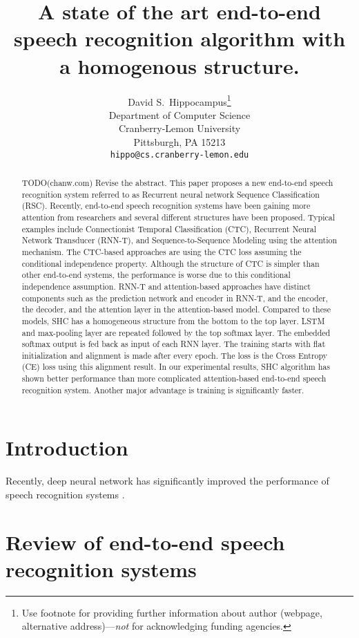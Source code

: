 \documentclass{article}
\title{A state of the art end-to-end speech recognition algorithm with
a homogenous structure.}
\author{
  David S.~Hippocampus\thanks{Use footnote for providing further
    information about author (webpage, alternative
    address)---\emph{not} for acknowledging funding agencies.} \\
  Department of Computer Science\\
  Cranberry-Lemon University\\
  Pittsburgh, PA 15213 \\
  \texttt{hippo@cs.cranberry-lemon.edu} \\
}
\begin{document}

\maketitle

\begin{abstract}
TODO(chanw.com) Revise the abstract.
This paper proposes a new end-to-end speech recognition system referred to
as Recurrent neural network Sequence Classification (RSC). Recently, end-to-end speech
recognition systems have been gaining more attention from researchers and
several different structures have been proposed. Typical examples  
include Connectionist Temporal Classification (CTC), Recurrent Neural Network
  Transducer (RNN-T), and Sequence-to-Sequence Modeling using the attention
mechanism. The CTC-based approaches are using the CTC loss assuming the
conditional independence property. Although the structure of CTC is simpler
than other end-to-end systems, the performance is worse due to this conditional
independence assumption. RNN-T and attention-based approaches have distinct
components such as the prediction network  and encoder in RNN-T, and
the encoder, the decoder, and the attention layer in the attention-based model.
Compared to these models, SHC has a homogeneous structure from the bottom to 
the top layer. LSTM and max-pooling layer are repeated followed by the top
softmax layer. The embedded softmax output is fed back as input of each RNN
layer. The training starts with flat initialization and alignment is made
after every epoch. The loss is the Cross Entropy (CE) loss using this 
alignment result. In our experimental results, SHC algorithm has shown 
better performance than more complicated attention-based end-to-end speech
recognition system. Another major advantage is training is significantly
faster.
\end{abstract}

\section{Introduction}

Recently, deep neural network has significantly improved the performance
of speech recognition systems \cite{}.


\section{Review of end-to-end speech recognition systems}
\end{document}
